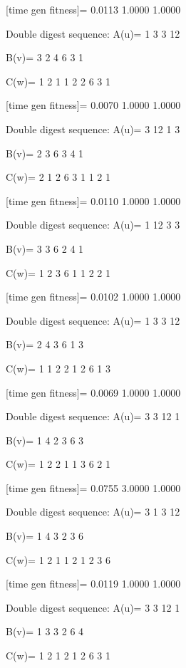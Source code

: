 [time gen fitness]=
    0.0113    1.0000    1.0000

Double digest sequence:
A(u)=
     1     3     3    12

B(v)=
     3     2     4     6     3     1

C(w)=
     1     2     1     1     2     2     6     3     1

[time gen fitness]=
    0.0070    1.0000    1.0000

Double digest sequence:
A(u)=
     3    12     1     3

B(v)=
     2     3     6     3     4     1

C(w)=
     2     1     2     6     3     1     1     2     1

[time gen fitness]=
    0.0110    1.0000    1.0000

Double digest sequence:
A(u)=
     1    12     3     3

B(v)=
     3     3     6     2     4     1

C(w)=
     1     2     3     6     1     1     2     2     1

[time gen fitness]=
    0.0102    1.0000    1.0000

Double digest sequence:
A(u)=
     1     3     3    12

B(v)=
     2     4     3     6     1     3

C(w)=
     1     1     2     2     1     2     6     1     3

[time gen fitness]=
    0.0069    1.0000    1.0000

Double digest sequence:
A(u)=
     3     3    12     1

B(v)=
     1     4     2     3     6     3

C(w)=
     1     2     2     1     1     3     6     2     1

[time gen fitness]=
    0.0755    3.0000    1.0000

Double digest sequence:
A(u)=
     3     1     3    12

B(v)=
     1     4     3     2     3     6

C(w)=
     1     2     1     1     2     1     2     3     6

[time gen fitness]=
    0.0119    1.0000    1.0000

Double digest sequence:
A(u)=
     3     3    12     1

B(v)=
     1     3     3     2     6     4

C(w)=
     1     2     1     2     1     2     6     3     1

